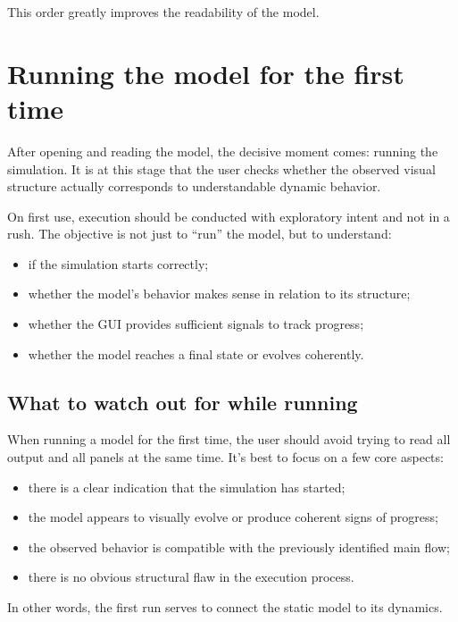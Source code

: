 This order greatly improves the readability of the model.

\section{Running the model for the first time}
\label{sec:cap4_executando_modelo_primeira_vez}

After opening and reading the model, the decisive moment comes: running the simulation. It is at this stage that the user checks whether the observed visual structure actually corresponds to understandable dynamic behavior.

On first use, execution should be conducted with exploratory intent and not in a rush. The objective is not just to ``run'' the model, but to understand:
\begin{itemize}
\item if the simulation starts correctly;
\item whether the model's behavior makes sense in relation to its structure;
\item whether the GUI provides sufficient signals to track progress;
\item whether the model reaches a final state or evolves coherently.
\end{itemize}

\subsection{What to watch out for while running}
\label{subsec:cap4_o_que_observar_durante_execucao}

When running a model for the first time, the user should avoid trying to read all output and all panels at the same time. It's best to focus on a few core aspects:

\begin{itemize}
\item there is a clear indication that the simulation has started;
\item the model appears to visually evolve or produce coherent signs of progress;
\item the observed behavior is compatible with the previously identified main flow;
\item there is no obvious structural flaw in the execution process.
\end{itemize}

In other words, the first run serves to connect the static model to its dynamics.

